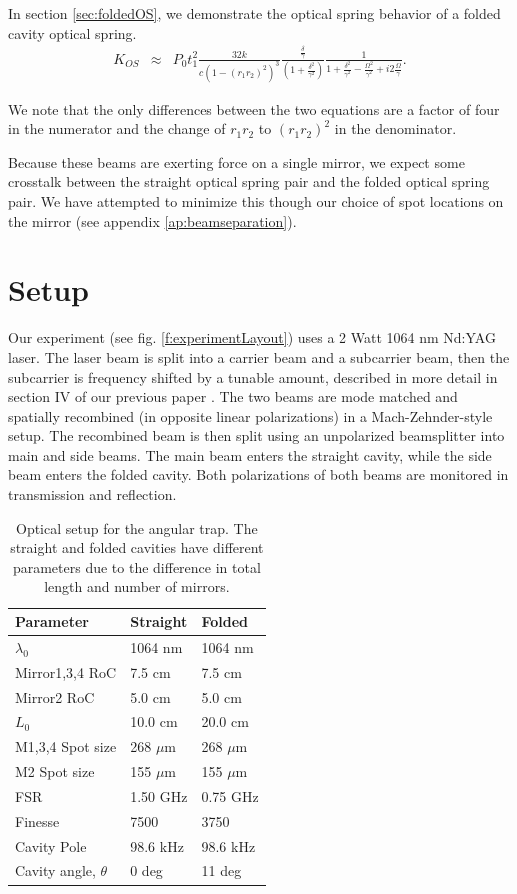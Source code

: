 In section \ref{sec:foldedOS}, we demonstrate the optical spring behavior of a folded cavity optical spring.
\begin{eqnarray}
\label{eq:KOSfolded}
K_{OS} & {\approx} & P_0 t_1^2 \frac{32k}{c(1-(r_1r_2)^2)^3}\frac{ \frac{\delta}{\gamma}}{(1+\frac{\delta^2}{\gamma^2})} 
\frac{1}{1+\frac{\delta^2}{\gamma^2}-\frac{\Omega^2}{\gamma^2}+i2\frac{\Omega}{\gamma} }.
\end{eqnarray}

We note that the only differences between the two equations are a factor of four in the numerator and the change of $r_1r_2$ to $(r_1r_2)^2$ in the denominator.

Because these beams are exerting force on a single mirror, we expect some crosstalk between the straight optical spring pair and the folded optical spring pair. We have attempted to minimize this though our choice of spot locations on the mirror (see appendix \ref{ap:beamseparation}).


\section{Setup}
Our experiment (see fig. \ref{f:experimentLayout}) uses a 2 Watt 1064 nm Nd:YAG laser. The laser beam is split into a carrier beam and a subcarrier beam, then the subcarrier is frequency shifted by a tunable amount, described in more detail in section IV of our previous paper \cite{Kelley15}. The two beams are mode matched and spatially recombined (in opposite linear polarizations) in a Mach-Zehnder-style setup. The recombined beam is then split using an unpolarized beamsplitter into main and side beams. The main beam enters the straight cavity, while the side beam enters the folded cavity. Both polarizations of both beams are monitored in transmission and reflection.



\begin{table}[htb]
\centering
\begin{tabular}{|l|l|l|}
\hline
Parameter & Straight & Folded \\ \hline
$\lambda_0$ & 1064 nm & 1064 nm \\ \hline
Mirror1,3,4 RoC & 7.5 cm & 7.5 cm \\ \hline
Mirror2 RoC & 5.0 cm & 5.0 cm \\ \hline
$L_0$ & 10.0 cm & 20.0 cm \\ \hline
M1,3,4 Spot size  & 268 $\mu$m & 268 $\mu$m\\ \hline
M2 Spot size  & 155 $\mu$m & 155 $\mu$m\\ \hline
FSR      & 1.50 GHz & 0.75 GHz \\ \hline
Finesse & 7500 & 3750 \\ \hline
Cavity Pole & 98.6 kHz & 98.6 kHz\\ \hline
Cavity angle, $\theta$ & 0 deg & 11 deg\\ \hline
\end{tabular}
\caption[Angular trap optical parameters]{Optical setup for the angular trap. The straight and folded cavities have different parameters due to the difference in total length and number of mirrors.}
\label{tab:longAngParams}
\end{table}


